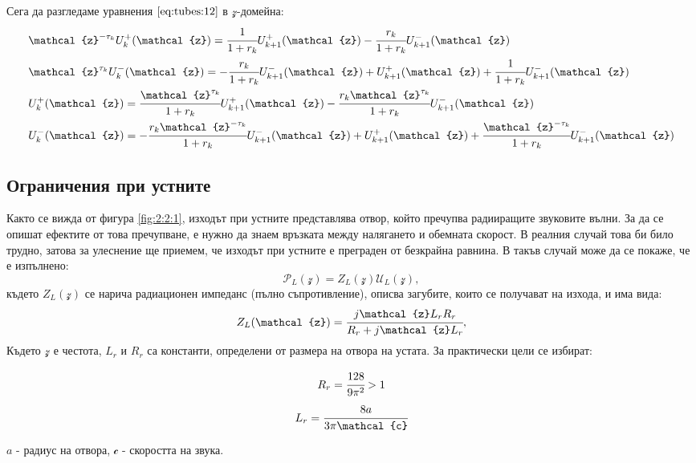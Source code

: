 \documentclass[main.tex]{subfiles}
\begin{document}
Сега да разгледаме уравнения $\eqref{eq:tubes:12}$ в $\mathcal{z}$-домейна:
\begin{subequations}
    \label{eq:tubes:13}
    \begin{align}
        & \nonumber \mathcal{z}^{-\tau_k}U_k^{+}(\mathcal{z}) = \cfrac{1}{1 + r_k} U_{k+1}^{+}(\mathcal{z}) - \cfrac{r_k}{1+r_k} U_{k+1}^{-}(\mathcal{z}) \\
        & \nonumber \mathcal{z}^{\tau_k} U_k^{-}(\mathcal{z}) = - \cfrac{r_k}{1+r_k} U_{k+1}^{-}(\mathcal{z}) + U_{k+1}^{+}(\mathcal{z}) + \cfrac{1}{1 + r_k} U_{k+1}^{-}(\mathcal{z}) \\
        & U_k^{+}(\mathcal{z}) = \cfrac{\mathcal{z}^{\tau_k}}{1 + r_k} U_{k+1}^{+}(\mathcal{z}) - \cfrac{r_k\mathcal{z}^{\tau_k}}{1+r_k} U_{k+1}^{-}(\mathcal{z})\\
        & U_k^{-}(\mathcal{z}) = - \cfrac{r_k\mathcal{z}^{-\tau_k} }{1+r_k} U_{k+1}^{-}(\mathcal{z}) + U_{k+1}^{+}(\mathcal{z}) + \cfrac{\mathcal{z}^{-\tau_k} }{1 + r_k} U_{k+1}^{-}(\mathcal{z})
    \end{align}
\end{subequations}

\subsection{Ограничения при устните}
Както се вижда от фигура \autoref{fig:2:2:1}, изходът при устните представлява отвор, който
пречупва радииращите звуковите вълни.
За да се опишат ефектите от това пречупване, е нужно да знаем връзката между
налягането и обемната скорост. В реалния случай това би било трудно, затова за улеснение
ще приемем, че изходът при устните е преграден от безкрайна равнина. В такъв случай може
да се покаже, че е изпълнено:
\begin{equation}
    \label{eq:tubes:14}
    \mathcal{P}_L(\mathcal{z}) = Z_L(\mathcal{z}) \mathcal{U}_L(\mathcal{z}),
\end{equation}
където 
$Z_L(\mathcal{z})$ се нарича радиационен импеданс (пълно съпротивление), описва загубите, които се получават на изхода, и има вида:
\[
    Z_L(\mathcal{z}) = \cfrac{j\mathcal{z} L_r R_r}{R_r + j\mathcal{z} L_r},    
\]
Където $\mathcal{z}$ е честота, $L_r$ и $R_r$ са константи, определени от размера на отвора на устата. За практически цели се избират:

\begin{multicols}{2}
    \begin{equation*}
      R_r = \cfrac{128}{9\pi^2} > 1
    \end{equation*}\break
    \begin{equation*}
      L_r = \cfrac{8a}{3\pi \mathcal{c}}
    \end{equation*}
  \end{multicols}
$a$ - радиус на отвора, $\mathcal{c}$ - скоростта на звука.
\end{document}
